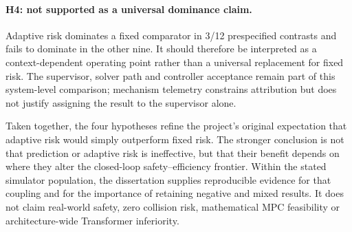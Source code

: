 \paragraph{H4: not supported as a universal dominance claim.}
Adaptive risk dominates a fixed comparator in 3/12 prespecified contrasts and
fails to dominate in the other nine. It should therefore be interpreted as a
context-dependent operating point rather than a universal replacement for
fixed risk. The supervisor, solver path and controller acceptance remain part
of this system-level comparison; mechanism telemetry constrains attribution
but does not justify assigning the result to the supervisor alone.



Taken together, the four hypotheses refine the project's original expectation
that adaptive risk would simply outperform fixed risk. The stronger conclusion
is not that prediction or adaptive risk is ineffective, but that their benefit
depends on where they alter the closed-loop safety--efficiency frontier. Within
the stated simulator population, the dissertation supplies reproducible
evidence for that coupling and for the importance of retaining negative and
mixed results. It does not claim real-world safety, zero collision risk,
mathematical MPC feasibility or architecture-wide Transformer inferiority.
